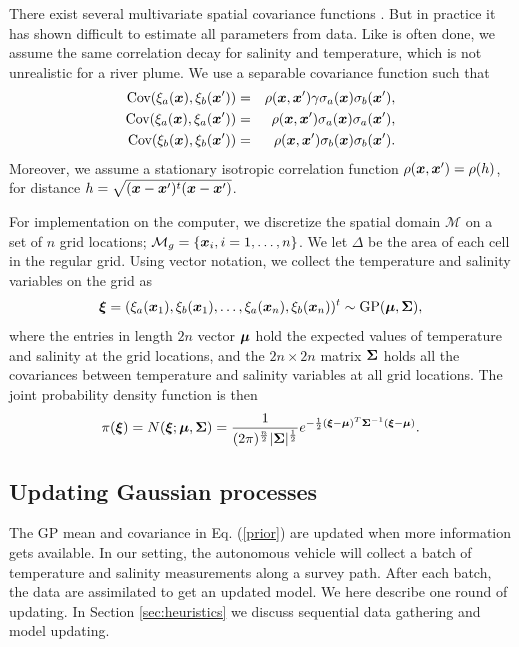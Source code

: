 \documentclass[aoas]{imsart}
\begin{document}
There exist several multivariate spatial covariance functions \citep{gneiting2010matern,genton2015cross}. But in practice it has shown difficult to estimate all parameters from data. Like is often done, we assume the same correlation decay for salinity and temperature, which is not unrealistic for a river plume. We use a separable covariance function such that
\begin{eqnarray}\label{gp_corr}
\mbox{Cov}(\xi_a(\bx),\xi_b(\bx')) &=& \rho(\bx,\bx') \gamma \sigma_a(\bx) \sigma_b(\bx'), \\
\mbox{Cov}(\xi_a(\bx),\xi_a(\bx')) &=& \rho(\bx,\bx') \sigma_a(\bx) \sigma_a(\bx'), \nonumber \\
\mbox{Cov}(\xi_b(\bx),\xi_b(\bx')) &=& \rho(\bx,\bx') \sigma_b(\bx) \sigma_b(\bx'). \nonumber
\end{eqnarray}
Moreover, we assume a stationary isotropic correlation function $\rho({\boldsymbol x},{\boldsymbol x}')=\rho(h)$, for distance $h=\sqrt{({\boldsymbol x}-{\boldsymbol x}')^t ({\boldsymbol x}-{\boldsymbol x}')}$.

For implementation on the computer, we discretize the spatial domain $\mathcal{M}$ on a set of $n$ grid locations; $\mathcal{M}_g = \{{\boldsymbol x}_i, i=1,\ldots,n \}$.
We let $\Delta$ be the area of each cell in the regular grid.
Using vector notation, we collect the temperature and salinity variables on the grid as
\begin{equation}
    \bxi=(\xi_a(\bx_1),\xi_b(\bx_1),\ldots,\xi_a(\bx_n),\xi_b(\bx_n))^t \sim \mbox{GP} (\bmu,\bSigma), \nonumber
\end{equation}
where the entries in length $2 n$ vector ${\boldsymbol \mu}$ hold the expected values of temperature and salinity at the grid locations, and the $2n \times 2n$ matrix ${\boldsymbol \Sigma}$ holds all the covariances between temperature and salinity variables at all grid locations. 
 The joint probability density function is then
\begin{equation}\label{prior}
\pi(\bxi) = N(\bxi;\bmu,\bSigma) = \frac{1}{(2\pi)^{\frac{n}{2}}|\bSigma|^{\frac{1}{2}}}e^{-\frac{1}{2}(\bxi -\bmu)^T\bSigma^{-1}(\bxi - \bmu)}.
\end{equation}


\subsection{Updating Gaussian processes}

The GP mean and covariance in Eq. (\ref{prior}) are updated when more information gets available. 
In our setting, the autonomous vehicle will collect a batch of temperature and salinity measurements along a survey path. After each batch, the data are assimilated to get an updated model.
We here describe one round of updating. In Section \ref{sec:heuristics} we discuss sequential data gathering and model updating.
\end{document}
